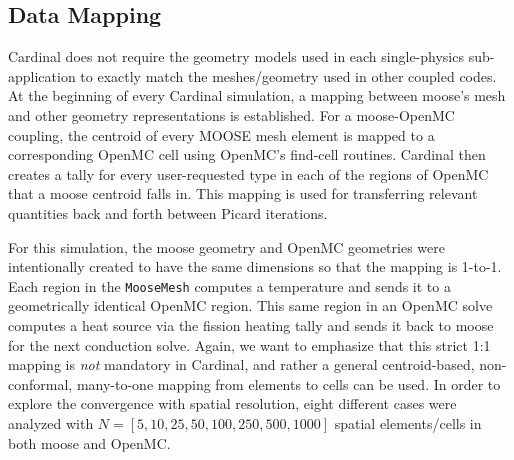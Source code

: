 \documentclass[letterpaper]{mc2023}
\begin{document}
\subsection{Data Mapping}
Cardinal does not require the geometry models used in each single-physics sub-application to exactly match the meshes/geometry used in
other coupled codes. At the beginning of every Cardinal simulation, a mapping between \gls{moose}'s mesh and other geometry representations
is established. For a \gls{moose}-OpenMC coupling, the centroid of every MOOSE mesh element is mapped to a corresponding OpenMC cell using
OpenMC's find-cell routines. Cardinal then creates a tally for every user-requested type in each of the regions of OpenMC that a \gls{moose}
centroid falls in. This mapping is used for transferring relevant quantities back and forth between Picard iterations. 

For this simulation, the \gls{moose} geometry and OpenMC geometries were intentionally created to have the same dimensions so that the
mapping is 1-to-1. Each region in the \texttt{MooseMesh} computes a temperature and sends it to a geometrically identical OpenMC region.
This same region in an OpenMC solve computes a heat source via the fission heating tally and sends it back to \gls{moose} for the next
conduction solve. Again, we want to emphasize that this strict 1:1 mapping is {\it not} mandatory in Cardinal, and rather a general
centroid-based, non-conformal, many-to-one mapping from elements to cells can be used. In order to explore the convergence with spatial
resolution, eight different cases were analyzed with $N=[5,10,25,50,100,250,500,1000]$ spatial elements/cells in both \gls{moose} and OpenMC.
\end{document}
